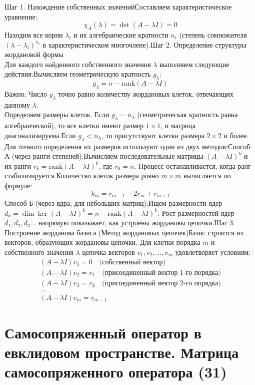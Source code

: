 \documentclass[14pt]{extreport}
\begin{document}
    Шаг 1. Нахождение собственных значенийСоставляем характеристическое уравнение:$$\chi_A(\lambda) = \det(A - \lambda I) = 0$$Находим все корни $\lambda_i$ и их алгебраические кратности $n_i$ (степень сомножителя $(\lambda - \lambda_i)^{n_i}$ в характеристическом многочлене).Шаг 2. Определение структуры жордановой формы \\ 
    Для каждого найденного собственного значения $\lambda$ выполняем следующие действия:Вычисляем геометрическую кратность $g_\lambda$:$$g_\lambda = n - \text{rank}(A - \lambda I)$$Важно: 
    Число $g_\lambda$ точно равно количеству жордановых клеток, отвечающих данному $\lambda$. \\
    Определяем размеры клеток. Если $g_\lambda = n_\lambda$ (геометрическая кратность равна алгебраической), то все клетки имеют 
    размер $1 \times 1$, и матрица диагонализируема.Если $g_\lambda < n_\lambda$, то присутствуют клетки размера $2 \times 2$ и более.
     Для точного определения их размеров используют один из двух методов:Способ А (через ранги степеней):Вычисляем последовательные матрицы $(A - \lambda I)^k$ и их ранги $r_k = \text{rank}(A - \lambda I)^k$, где $r_0 = n$. Процесс останавливается, когда ранг стабилизируется.Количество клеток размера ровно $m \times m$ вычисляется по формуле:$$k_m = r_{m-1} - 2r_m + r_{m+1}$$Способ Б (через ядра, для небольших матриц):Ищем размерности ядер $d_k = \dim \ker(A - \lambda I)^k = n - \text{rank}(A - \lambda I)^k$. Рост размерностей ядер $d_1, d_2, d_3 \dots$ напрямую показывает, как устроены жордановы цепочки.Шаг 3. Построение жорданова базиса (Метод жордановых цепочек)Базис строится из векторов, образующих жордановы цепочки. Для клетки порядка $m$ и собственного значения $\lambda$ цепочка векторов $v_1, v_2, \dots, v_m$ удовлетворяет условиям:$$\begin{array}{l}
(A - \lambda I)v_1 = 0 \quad \text{(собственный вектор)} \\
(A - \lambda I)v_2 = v_1 \quad \text{(присоединенный вектор 1-го порядка)} \\
(A - \lambda I)v_3 = v_2 \quad \text{(присоединенный вектор 2-го порядка)} \\
\dots \\
(A - \lambda I)v_m = v_{m-1}
\end{array}$$

    \chapter{Самосопряженный оператор в евклидовом пространстве. Матрица самосопряженного оператора (31)}
\end{document}
